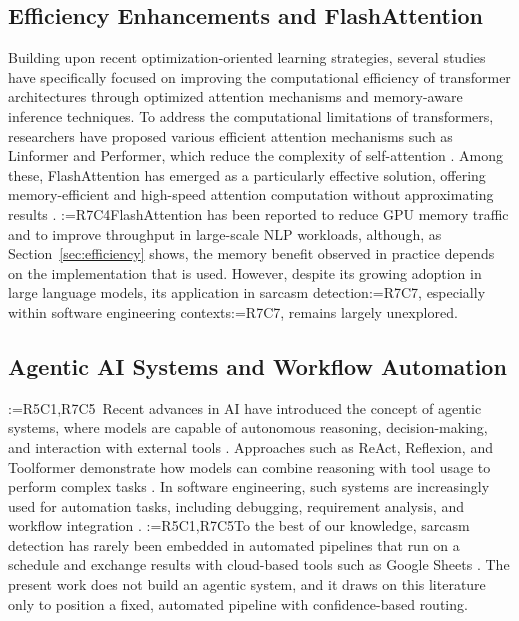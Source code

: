\documentclass[a4paper,fleqn]{cas-sc}
\makeatletter
\newif\iftracked
\newcommand{\rv@setcolour}[1]{%
  \IfStrEq{#1}{R7C7}{\color{rvEdit}}{%
    \IfSubStr{#1}{R5}{\IfSubStr{#1}{R7}{\color{rvBoth}}{\color{rvFive}}}{\color{rvSeven}}}}
\newcommand{\rv@tag}[1]{\textsuperscript{\sffamily\bfseries\scriptsize[\StrSubstitute{#1}{,}{, }]}\,}
\newcommand{\rv@recordone}[1]{%
  \edef\rv@i{#1}%
  \ifcsdef{rv@n@\rv@i}{}{\csgdef{rv@n@\rv@i}{0}}%
  \csxdef{rv@n@\rv@i}{\the\numexpr\csuse{rv@n@\rv@i}+1\relax}%
  \begingroup\edef\@currentlabel{\rv@i}\label{rv:\rv@i:\csuse{rv@n@\rv@i}}\endgroup}
\newcommand{\rv@record}[1]{\@for\rv@id:=#1\do{\expandafter\rv@recordone\expandafter{\rv@id}}}
\DeclareRobustCommand{\rcx}[2]{\iftracked{\rv@setcolour{#1}\rv@tag{#1}#2}\else#2\fi}
\DeclareRobustCommand{\rcmark}[1]{\rv@record{#1}}
\DeclareRobustCommand{\rcrep}[3]{\rv@record{#1}\iftracked{\rv@setcolour{#1}\rv@tag{#1}\rv@strike{#2} #3}\else#3\fi}
\DeclareRobustCommand{\rce}[1]{\rv@record{R7C7}\iftracked{\color{rvEdit}#1}\else#1\fi}
\DeclareRobustCommand{\rvstrikeplain}[1]{\rv@strike{#1}}
\makeatother
\begin{document}
\subsection{Efficiency Enhancements and FlashAttention}
Building upon recent optimization-oriented learning strategies, several studies have specifically focused on improving the computational efficiency of transformer architectures through optimized attention mechanisms and memory-aware inference techniques. To address the computational limitations of transformers, researchers have proposed various efficient attention mechanisms such as Linformer and Performer, which reduce the complexity of self-attention \citep{wang2020linformer,han2024agent}. Among these, FlashAttention has emerged as a particularly effective solution, offering memory-efficient and high-speed attention computation without approximating results \citep{dao2022flashattention,dao2024flashattention2}. \rcrep{R7C4}{FlashAttention significantly reduces GPU memory usage and improves throughput, making it suitable for large-scale NLP tasks.}{FlashAttention has been reported to reduce GPU memory traffic and to improve throughput in large-scale NLP workloads, although, as Section~\ref{sec:efficiency} shows, the memory benefit observed in practice depends on the implementation that is used.} However, despite its growing adoption in large language models, its application in sarcasm detection\rce{,} especially within software engineering contexts\rce{,} remains largely unexplored.

\subsection{\texorpdfstring{\rcx{R5C1,R7C5}{Agentic AI Systems and Workflow Automation}}{Agentic AI Systems and Workflow Automation}}
\rcmark{R5C1,R7C5}\iftracked{\color{rvBoth}\textsuperscript{\sffamily\bfseries\scriptsize[R5C1, R7C5]}\,\rvstrikeplain{Previous heading: Agentic AI and Cloud-Integrated Sarcasm Detection.}}\fi\ Recent advances in AI have introduced the concept of agentic systems, where models are capable of autonomous reasoning, decision-making, and interaction with external tools \citep{sharma2026toward,dattasmita2025civicxai,liu2026sevade}. Approaches such as ReAct, Reflexion, and Toolformer demonstrate how models can combine reasoning with tool usage to perform complex tasks \citep{yao2023react,shinn2023reflexion,schick2023toolformer}. In software engineering, such systems are increasingly used for automation tasks, including debugging, requirement analysis, and workflow integration \citep{shinn2023reflexion,fan2023large}. \rcrep{R5C1,R7C5}{However, existing research has not explored the integration of sarcasm detection into an agentic pipeline that operates continuously and interacts with cloud-based tools such as Google Sheets.}{To the best of our knowledge, sarcasm detection has rarely been embedded in automated pipelines that run on a schedule and exchange results with cloud-based tools such as Google Sheets \citep{mane2026indicag,nguyen2026generative}. The present work does not build an agentic system, and it draws on this literature only to position a fixed, automated pipeline with confidence-based routing.}
\end{document}
